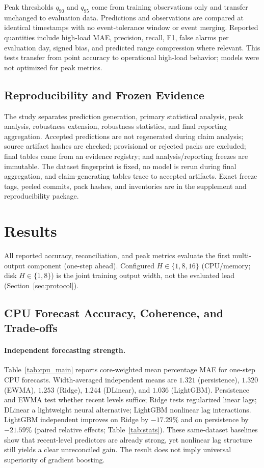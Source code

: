 \documentclass[a4paper,fleqn]{cas-dc}
\begin{document}
Peak thresholds $q_{90}$ and $q_{95}$ come from training observations only and
transfer unchanged to evaluation data.
Predictions and observations are compared at identical timestamps with no
event-tolerance window or event merging.
Reported quantities include high-load {MAE}, precision, recall, {F1}, false
alarms per evaluation day, signed bias, and predicted range compression where
relevant.
This tests transfer from point accuracy to operational high-load behavior;
models were not optimized for peak metrics.

\subsection{Reproducibility and Frozen Evidence}
The study separates prediction generation, primary statistical analysis, peak
analysis, robustness extension, robustness statistics, and final reporting
aggregation.
Accepted predictions are not regenerated during claim analysis; source artifact
hashes are checked; provisional or rejected packs are excluded; final tables come
from an evidence registry; and analysis/reporting freezes are immutable.
The dataset fingerprint is fixed, no model is rerun during final aggregation, and
claim-generating tables trace to accepted artifacts.
Exact freeze tags, peeled commits, pack hashes, and inventories are in the
supplement and reproducibility package.

\section{Results}
\label{sec:results}

All reported accuracy, reconciliation, and peak metrics evaluate the first
multi-output component (one-step ahead).
Configured $H\in\{1,8,16\}$ ({CPU}/memory; disk $H\in\{1,8\}$) is the joint
training output width, not the evaluated lead
(Section~\ref{sec:protocol}).

\subsection{{CPU} Forecast Accuracy, Coherence, and Trade-offs}
\label{sec:cpu}
\paragraph{Independent forecasting strength.}
Table~\ref{tab:cpu_main} reports core-weighted mean percentage {MAE} for
one-step {CPU} forecasts.
Width-averaged independent means are $1.321$ (persistence), $1.320$ ({EWMA}),
$1.253$ (Ridge), $1.244$ (DLinear), and $1.036$ (LightGBM).
Persistence and {EWMA} test whether recent levels suffice; Ridge tests
regularized linear lags; DLinear a lightweight neural alternative; LightGBM
nonlinear lag interactions.
LightGBM independent improves on Ridge by $-17.29\%$ and on persistence by
$-21.59\%$ (paired relative effects; Table~\ref{tab:stats}).
These same-dataset baselines show that recent-level predictors are already
strong, yet nonlinear lag structure still yields a clear unreconciled gain.
The result does not imply universal superiority of gradient boosting.
\end{document}
